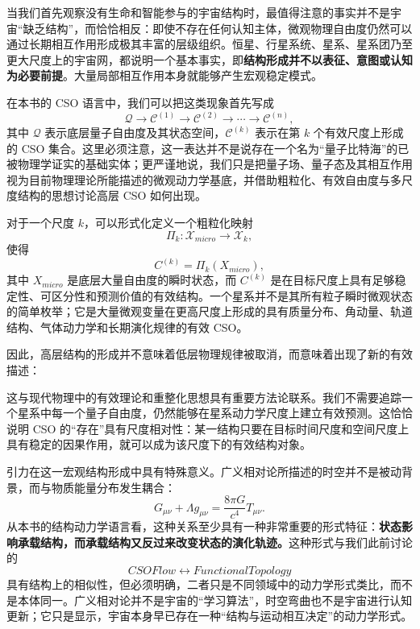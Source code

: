 当我们首先观察没有生命和智能参与的宇宙结构时，最值得注意的事实并不是宇宙“缺乏结构”，而恰恰相反：即使不存在任何认知主体，微观物理自由度仍然可以通过长期相互作用形成极其丰富的层级组织。恒星、行星系统、星系、星系团乃至更大尺度上的宇宙网，都说明一个基本事实，即\textbf{结构形成并不以表征、意图或认知为必要前提}。大量局部相互作用本身就能够产生宏观稳定模式。

在本书的 CSO 语言中，我们可以把这类现象首先写成
\[
\mathcal{Q}
\longrightarrow
\mathcal{C}^{(1)}
\longrightarrow
\mathcal{C}^{(2)}
\longrightarrow
\cdots
\longrightarrow
\mathcal{C}^{(n)},
\]
其中 $\mathcal{Q}$ 表示底层量子自由度及其状态空间，$\mathcal{C}^{(k)}$ 表示在第 $k$ 个有效尺度上形成的 CSO 集合。这里必须注意，这一表达并不是说存在一个名为“量子比特海”的已被物理学证实的基础实体；更严谨地说，我们只是把量子场、量子态及其相互作用视为目前物理理论所能描述的微观动力学基底，并借助粗粒化、有效自由度与多尺度结构的思想讨论高层 CSO 如何出现。

对于一个尺度 $k$，可以形式化定义一个粗粒化映射
\[
\Pi_k:\mathcal{X}_{micro}\rightarrow\mathcal{X}_{k},
\]
使得
\[
C^{(k)}=\Pi_k(X_{micro}),
\]
其中 $X_{micro}$ 是底层大量自由度的瞬时状态，而 $C^{(k)}$ 是在目标尺度上具有足够稳定性、可区分性和预测价值的有效结构。一个星系并不是其所有粒子瞬时微观状态的简单枚举；它是大量微观变量在更高尺度上形成的具有质量分布、角动量、轨道结构、气体动力学和长期演化规律的有效 CSO。

因此，高层结构的形成并不意味着低层物理规律被取消，而意味着出现了新的有效描述：
\begin{statementbox}
\centering
{}
\end{statementbox}
这与现代物理中的有效理论和重整化思想具有重要方法论联系。我们不需要追踪一个星系中每一个量子自由度，仍然能够在星系动力学尺度上建立有效预测。这恰恰说明 CSO 的“存在”具有尺度相对性：某一结构只要在目标时间尺度和空间尺度上具有稳定的因果作用，就可以成为该尺度下的有效结构对象。

引力在这一宏观结构形成中具有特殊意义。广义相对论所描述的时空并不是被动背景，而与物质能量分布发生耦合：
\[
G_{\mu\nu}
+\Lambda g_{\mu\nu}
=
\frac{8\pi G}{c^4}T_{\mu\nu}.
\]
从本书的结构动力学语言看，这种关系至少具有一种非常重要的形式特征：\textbf{状态影响承载结构，而承载结构又反过来改变状态的演化轨迹。}这种形式与我们此前讨论的
\[
CSOFlow\leftrightarrow FunctionalTopology
\]
具有结构上的相似性，但必须明确，二者只是不同领域中的动力学形式类比，而不是本体同一。广义相对论并不是宇宙的“学习算法”，时空弯曲也不是宇宙进行认知更新；它只是显示，宇宙本身早已存在一种“结构与运动相互决定”的动力学形式。


